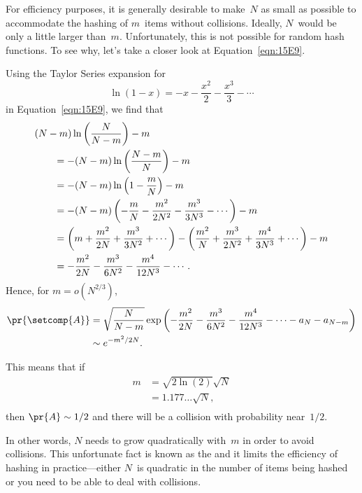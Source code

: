 For efficiency purposes, it is generally desirable to make~$N$ as
small as possible to accommodate the hashing of $m$~items without
collisions.  Ideally, $N$~would be only a little larger than~$m$.
Unfortunately, this is not possible for random hash functions.  To see
why, let's take a closer look at Equation~\ref{eqn:15E9}.

Using the Taylor Series expansion for
\begin{equation*}
    \ln(1 - x) = -x - \frac{x^2}{2} - \frac{x^3}{3} - \cdots
\end{equation*}
in Equation~\ref{eqn:15E9}, we find that
\begingroup
{}
\begin{align*}
\lefteqn{(N - m) \ln\left(\frac{N}{N - m}\right) - m}\qquad &\\
    &= -(N - m) \ln\left(\frac{N - m}{N}\right) - m \\
    &= -(N - m) \ln \left(1 - \frac{m}{N}\right) - m \\
    &= -(N - m)
        \left(-\frac{m}{N} - \frac{m^2}{2N^2} - \frac{m^3}{3N^3} -
                \cdots \right)
        - m \\
    &= \left( m + \frac{m^2}{2N} + \frac{m^3}{3N^2} + \cdots \right)
     - \left( \frac{m^2}{N} + \frac{m^3}{2N^2} + \frac{m^4}{3N^3} +
              \cdots \right)
     - m \\
    &= - \frac{m^2}{2N} - \frac{m^3}{6N^2} - \frac{m^4}{12N^3} - \cdots.
\end{align*}
Hence, for $m = o(N^{2/3})$,
\begin{align*}
\pr{\setcomp{A}}
    &= \sqrt{\frac{N}{N - m}}
        \exp\left(-\frac{m^2}{2N} - \frac{m^3}{6N^2} -
                  \frac{m^4}{12N^3} - \cdots - a_N - a_{N - m}
                  \right)\\
    &\sim e^{-m^2/2N}.
\end{align*}
\endgroup

This means that if
\begin{align*}
m   &= \sqrt{2 \ln(2)} \sqrt{N} \\
    &= 1.177\ldots \sqrt{N}, \\
\end{align*}
then $\pr{A} \sim 1/2$ and there will be a collision with probability
near~$1/2$.

In other words, $N$ needs to grow quadratically with~$m$ in order to
avoid collisions.  This unfortunate fact is known as the
 and it limits the efficiency of hashing in
practice---either $N$~is quadratic in the number of items being hashed
or you need to be able to deal with collisions.

\problemsection

\endinput
